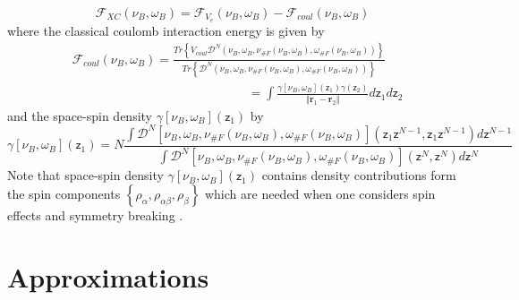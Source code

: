 \documentclass[aps,preprint]{revtex4}%
\begin{document}
\begin{equation}
\mathcal{F}_{XC}\left(  \nu_{B},\omega_{B}\right)  =\mathcal{F}_{V_{e}}\left(
\nu_{B},\omega_{B}\right)  -\mathcal{F}_{coul}\left(  \nu_{B},\omega
_{B}\right)
\end{equation}
where the classical coulomb interaction energy is given by
\begin{align}
&  \mathcal{F}_{coul}\left(  \nu_{B},\omega_{B}\right)  =\frac{Tr\left\{
V_{coul}\mathcal{D}^{N}\left(  \nu_{B},\omega_{B},\nu_{\#F}\left(  \nu
_{B},\omega_{B}\right)  ,\omega_{\#F}\left(  \nu_{B},\omega_{B}\right)
\right)  \right\}  }{Tr\left\{  \mathcal{D}^{N}\left(  \nu_{B},\omega_{B}%
,\nu_{\#F}\left(  \nu_{B},\omega_{B}\right)  ,\omega_{\#F}\left(  \nu
_{B},\omega_{B}\right)  \right)  \right\}  }\nonumber\\
&  \left.  {}\right.  \qquad\qquad\qquad\qquad\qquad\qquad\qquad=\int
\frac{\gamma\left[  \nu_{B},\omega_{B}\right]  \left(  \mathsf{z}_{1}\right)
\gamma\left(  \mathsf{z}_{2}\right)  }{\left\Vert \mathbf{r}_{1}%
-\mathbf{r}_{2}\right\Vert }d\mathsf{z}_{1}d\mathsf{z}_{2}%
\end{align}
and the space-spin density $\gamma\left[  \nu_{B},\omega_{B}\right]  \left(
\mathsf{z}_{1}\right)  $ by%
\begin{equation}
\gamma\left[  \nu_{B},\omega_{B}\right]  \left(  \mathsf{z}_{1}\right)
=N\frac{\int\mathcal{D}^{N}\left[  \nu_{B},\omega_{B},\nu_{\#F}\left(  \nu
_{B},\omega_{B}\right)  ,\omega_{\#F}\left(  \nu_{B},\omega_{B}\right)
\right]  \left(  \mathsf{z}_{1}\mathsf{z}^{N-1},\mathsf{z}_{1}\mathsf{z}%
^{N-1}\right)  d\mathsf{z}^{N-1}}{\int\mathcal{D}^{N}\left[  \nu_{B}%
,\omega_{B},\nu_{\#F}\left(  \nu_{B},\omega_{B}\right)  ,\omega_{\#F}\left(
\nu_{B},\omega_{B}\right)  \right]  \left(  \mathsf{z}^{N},\mathsf{z}%
^{N}\right)  d\mathsf{z}^{N}}%
\end{equation}
Note that space-spin density $\gamma\left[  \nu_{B},\omega_{B}\right]  \left(
\mathsf{z}_{1}\right)  $ contains density contributions form the spin
components $\left\{  \rho_{\alpha},\rho_{\alpha\beta},\rho_{\beta}\right\}  $
which are needed when one considers spin effects and symmetry breaking
\cite{WeinerTrickey98}.

\section{Approximations\label{approx}}
\end{document}
